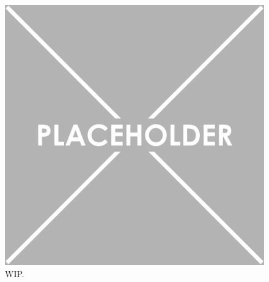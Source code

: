 \begin{samepage}
%
    WIP
  },
]{listings/point-chart-patterns.html}
\end{samepage}

\begin{figure}[tp]
\centering
\includegraphics[keepaspectratio,width=\linewidth,height=\fullh]{images/placeholder.png}
\caption[Results of Responsive Patterns Targeting Point Charts]{
  WIP.
}
\label{fig:PointChartPatterns}
\end{figure}